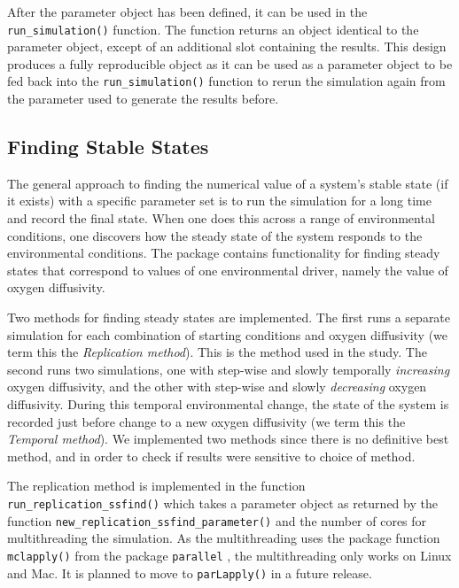 \documentclass[preprint,12pt, a4paper]{elsarticle}
\begin{document}
After the parameter object has been defined, it can be used in the
\texttt{run\_simulation()} function. The function returns an object
identical to the parameter object, except of an additional slot
containing the results. This design produces a fully reproducible object
as it can be used as a parameter object to be fed back into the
\texttt{run\_simulation()} function to rerun the simulation again from
the parameter used to generate the results before.

\hypertarget{finding-stable-states}{%
\subsection{Finding Stable States}\label{finding-stable-states}}

The general approach to finding the numerical value of a system's stable
state (if it exists) with a specific parameter set is to run the
simulation for a long time and record the final state. When one does
this across a range of environmental conditions, one discovers how the
steady state of the system responds to the environmental conditions. The
package contains functionality for finding steady states that correspond
to values of one environmental driver, namely the value of oxygen
diffusivity.

Two methods for finding steady states are implemented. The first runs a
separate simulation for each combination of starting conditions and
oxygen diffusivity (we term this the \emph{Replication method}). This is
the method used in the \citet{Bush2017} study. The second runs two
simulations, one with step-wise and slowly temporally \emph{increasing}
oxygen diffusivity, and the other with step-wise and slowly
\emph{decreasing} oxygen diffusivity. During this temporal environmental
change, the state of the system is recorded just before change to a new
oxygen diffusivity (we term this the \emph{Temporal method}). We
implemented two methods since there is no definitive best method, and in
order to check if results were sensitive to choice of method.

The replication method is implemented in the function
\texttt{run\_replication\_ssfind()} which takes a parameter object as
returned by the function \texttt{new\_replication\_ssfind\_parameter()}
and the number of cores for multithreading the simulation. As the
multithreading uses the package function \texttt{mclapply()} from the
package \texttt{parallel} \citep{RCoreTeam2022}, the multithreading only
works on Linux and Mac. It is planned to move to \texttt{parLapply()}
\citep{RCoreTeam2022} in a future release.
\end{document}
